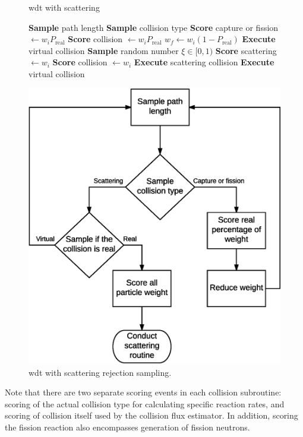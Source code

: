 \begin{figure}[p]
\begin{algorithm}[H]
\caption{\Acrlong{wdt} with scattering}\label{alg:scattalg}
\begin{algorithmic}[1]
  \State \textbf{Sample} path length
  \State \textbf{Sample} collision type
    \State \textbf{Score} capture or fission $\gets
    w_iP_\mathrm{real}$
    \State \textbf{Score} collision  $\gets w_iP_\mathrm{real}$
    \State $w_f \gets w_i(1-P_\mathrm{real})$
    \State \textbf{Execute} virtual collision
  \Else
    \State \textbf{Sample} random number $\xi \in [0,1)$
     
    \State \textbf{Score} scattering $\gets w_i$
    \State \textbf{Score} collision $\gets w_i$
      \State \textbf{Execute} scattering collision
    \Else {}
    \State \textbf{Execute} virtual collision
    \EndIf
  \EndIf
\end{algorithmic}
\end{algorithm}
  \centering
  \includegraphics[scale=0.5]{images/wdt}
  \caption{\Acrlong{wdt} with scattering rejection sampling.\label{fig:wdt}}
\end{figure}
Note that there are two separate scoring events in each collision
subroutine: scoring of the actual collision type for calculating
specific reaction rates, and scoring of collision itself used by the
collision flux estimator. In addition, scoring the fission reaction
also encompasses generation of fission neutrons.

